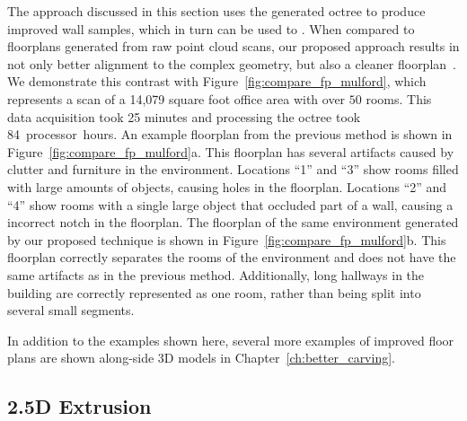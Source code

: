 \documentclass[12pt,onecolumn,oneside]{book}
\begin{document}
The approach discussed in this section uses the generated octree to produce improved wall samples, which in turn can be used to .  When compared to floorplans generated from raw point cloud scans, our proposed approach results in not only better alignment to the complex geometry, but also a cleaner floorplan~\cite{Turner14}.  We demonstrate this contrast with Figure~\ref{fig:compare_fp_mulford}, which represents a scan of a 14,079 square foot office area with over $50$ rooms.  This data acquisition took 25 minutes and processing the octree took 84~processor~hours.  An example floorplan from the previous method is shown in Figure~\ref{fig:compare_fp_mulford}a.  This floorplan has several artifacts caused by clutter and furniture in the environment.  Locations ``1'' and ``3'' show rooms filled with large amounts of objects, causing holes in the floorplan.  Locations ``2'' and ``4'' show rooms with a single large object that occluded part of a wall, causing a incorrect notch in the floorplan.  The floorplan of the same environment generated by our proposed technique is shown in Figure~\ref{fig:compare_fp_mulford}b.  This floorplan correctly separates the rooms of the environment and does not have the same artifacts as in the previous method.  Additionally, long hallways in the building are correctly represented as one room, rather than being split into several small segments.

In addition to the examples shown here, several more examples of improved floor plans are shown along-side 3D models in Chapter~\ref{ch:better_carving}.

\subsection{2.5D Extrusion}
\label{ssec:octree_fp_extrusion}
\end{document}
